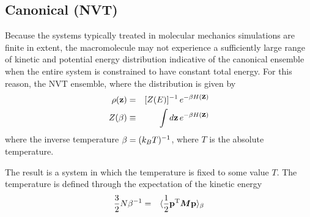 

\subsection{Canonical (NVT)}
\label{section:nvt}
 
  
Because the systems typically treated in molecular mechanics simulations are finite in extent, the macromolecule may not experience a sufficiently large range of kinetic and potential energy distribution indicative of the canonical ensemble when the entire system is constrained to have constant total energy.
For this reason, the NVT ensemble, where the distribution is given by
\begin{eqnarray}
\rho({\bf z}) &=& [Z(E)]^{-1} \, e^{-\beta H({\mbox{\boldmath{${\bf z}$}}})} \nonumber \\
Z(\beta) &\equiv& \int d{\bf z} \, e^{-\beta H({\mbox{\boldmath{${\bf z}$}}})}
\end{eqnarray}
where the inverse temperature $\beta = (k_B T)^{-1}$, where $T$ is the absolute temperature. \label{notation:canonical-partition-function}

The result is a system in which the temperature is fixed to some value $T$.
The temperature is defined through the expectation of the kinetic energy
\begin{eqnarray}
\frac{3}{2} N \beta^{-1} &=& \langle  \frac{1}{2} {\bf p}^{\mathrm{T}} {\mbox{\boldmath{$M$}}} {\bf p}  \rangle_\beta \label{equation:canonical-temperature}
\end{eqnarray}

